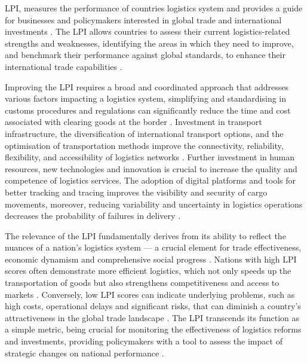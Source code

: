 \documentclass[conference]{IEEEtran}
\begin{document}
LPI, measures the performance of countries logistics system and provides a guide for businesses and policymakers interested in global trade and international investments \cite{arvis2016,arvis2018,arvis2023,civelek2015}. The LPI allows countries to assess their current logistics-related strengths and weaknesses, identifying the areas in which they need to improve, and benchmark their performance against global standards, to enhance their international trade capabilities \cite{beysenbaev2020,polat2023}.

Improving the LPI requires a broad and coordinated approach that addresses various factors impacting a logistics system, simplifying and standardising in customs procedures and regulations can significantly reduce the time and cost associated with clearing goods at the border \cite{babayigit2023,beysenbaev2020}. Investment in transport infrastructure, the diversification of international transport options, and the optimisation of transportation methods improve the connectivity, reliability, flexibility, and accessibility of logistics networks \cite{marti2014}. Further investment in human resources, new technologies and innovation is crucial to increase the quality and competence of logistics services. The adoption of digital platforms and tools for better tracking and tracing improves the visibility and security of cargo movements, moreover, reducing variability and uncertainty in logistics operations decreases the probability of failures in delivery \cite{WBreport2018}.

The relevance of the LPI fundamentally derives from its ability to reflect the nuances of a nation's logistics system — a crucial element for trade effectiveness, economic dynamism and comprehensive social progress \cite{rezaei2018, sharif2024}. Nations with high LPI scores often demonstrate more efficient logistics, which not only speeds up the transportation of goods but also strengthens competitiveness and access to markets \cite{worldbank4}. Conversely, low LPI scores can indicate underlying problems, such as high costs, operational delays and significant risks, that can diminish a country's attractiveness in the global trade landscape \cite{arvis2016,arvis2018,arvis2023}. The LPI transcends its function as a simple metric, being crucial for monitoring the effectiveness of logistics reforms and investments, providing policymakers with a tool to assess the impact of strategic changes on national performance \cite{worldbank5}. 
\end{document}
